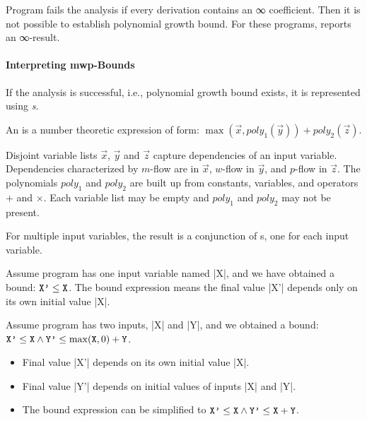 Program fails the analysis if every derivation contains an ∞
coefficient. Then it is not possible to establish polynomial growth bound. For
these programs,  reports an ∞-result.

\paragraph*{Interpreting mwp-Bounds}

If the analysis is successful, i.e., polynomial growth bound exists, it is
represented using \emph{s}.

An  is a number theoretic expression of form: \(\max(\vec x,
poly_1(\vec y)) + poly_2(\vec z)\).

Disjoint variable lists \(\vec x\), \(\vec y\) and \(\vec z\) capture
dependencies of an input variable. Dependencies characterized by
\(m\)-flow are in \(\vec x\), \(w\)-flow in \(\vec y\), and
\(p\)-flow in \(\vec z\). The polynomials \(poly_1\) and
\(poly_2\) are built up from constants, variables, and operators \(+\)
and \(\times\). Each variable list may be empty and \(poly_1\) and
\(poly_2\) may not be present.

For multiple input variables, the result is a conjunction of s,
one for each input variable.

\begin{example}
Assume program has one input variable named \pr|X|, and we have obtained a
bound: \(\prm{X'} \leq \prm{X}\). The bound expression means
the final value \pr|X'| depends only on its own initial value
\pr|X|.
\end{example}

\begin{example}
Assume program has two inputs, \pr|X| and \pr|Y|, and we obtained a bound:
\(\prm{X'} \leq \prm{X} \land \prm{Y'} \leq \max(\prm{X}, 0) + \prm{Y}\).
\end{example}

\begin{itemize}
\item Final value \pr|X'| depends on its own initial value \pr|X|.
\item Final value \pr|Y'| depends on initial values of inputs
\pr|X| and \pr|Y|.
\item The bound expression can be simplified to \(\prm{X'} \leq \prm{X} \land
\prm{Y'} \leq \prm{X} + \prm{Y}\).
\end{itemize}

